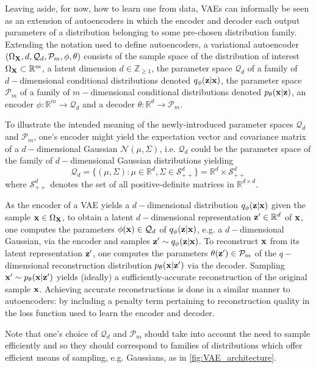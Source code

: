 \documentclass[11pt]{article}
\begin{document}
Leaving aside, for now, how to learn one from data, VAEs can informally be seen as an extension of autoencoders in which the encoder and decoder each output parameters of a distribution belonging to some pre-chosen distribution family. Extending the notation used to define autoencoders, a variational autoencoder $(\Omega_{\mathbf{X}},d,\mathcal{Q}_d,\mathcal{P}_m,\phi,\theta)$ consists of the sample space of the distribution of interest $\Omega_{\mathbf{X}}\subset\mathbb{R}^m$, a latent dimension $d\in\mathbb{Z}_{\geq1}$, the parameter space $\mathcal{Q}_d$ of a family of $d-$dimensional conditional distributions denoted $q_{\phi}(\mathbf{z}|\mathbf{x})$, the parameter space $\mathcal{P}_m$ of a family of $m-$dimensional conditional distributions denoted $p_{\theta}(\mathbf{x}|\mathbf{z})$, an encoder $\phi:\mathbb{R}^m\to\mathcal{Q}_d$ and a decoder $\theta:\mathbb{R}^d\to\mathcal{P}_m$.

To illustrate the intended meaning of the newly-introduced parameter spaces $\mathcal{Q}_d$ and $\mathcal{P}_m$, one's encoder might yield the expectation vector and covariance matrix of a $d-$dimensional Gaussian $\mathcal{N}(\mu,\Sigma)$, i.e. $\mathcal{Q}_d$ could be the parameter space of the family of $d-$dimensional Gaussian distributions yielding
$$
\mathcal{Q}_d
=
\{
(\mu,\Sigma):\mu\in\mathbb{R}^d, \Sigma\in\mathcal{S}_{++}^d
\}
=
\mathbb{R}^d\times\mathcal{S}_{++}^d
$$
where $\mathcal{S}_{++}^d$ denotes the set of all positive-definite matrices in $\mathbb{R}^{d\times d}$.

As the encoder of a VAE yields a $d-$dimensional distribution $q_{\phi}(\mathbf{z}|\mathbf{x})$ given the sample $\mathbf{x}\in\Omega_{\mathbf{X}}$, to obtain a latent $d-$dimensional representation $\mathbf{z}'\in\mathbb{R}^d$ of $\mathbf{x}$, one computes the parameters $\phi(\mathbf{x})\in\mathcal{Q}_d$ of $q_{\phi}(\mathbf{z}|\mathbf{x})$, e.g. a $d-$dimensional Gaussian, via the encoder and samples $\mathbf{z}'\sim q_{\phi}(\mathbf{z}|\mathbf{x})$. To reconstruct $\mathbf{x}$ from its latent representation $\mathbf{z}'$, one computes the parameters $\theta(\mathbf{z}')\in\mathcal{P}_m$ of the $q-$dimensional reconstruction distribution $p_{\theta}(\mathbf{x}|\mathbf{z}')$ via the decoder. Sampling $\mathbf{x}'\sim p_{\theta}(\mathbf{x}|\mathbf{z}')$ yields (ideally) a sufficiently-accurate reconstruction of the original sample $\mathbf{x}$. Achieving accurate reconstructions is done in a similar manner to autoencoders: by including a penalty term pertaining to reconstruction quality in the loss function used to learn the encoder and decoder.

Note that one's choice of $\mathcal{Q}_d$ and $\mathcal{P}_m$ should take into account the need to sample efficiently and so they should correspond to families of distributions which offer efficient means of sampling, e.g. Gaussians, as in \autoref{fig:VAE_architecture}.
\end{document}
